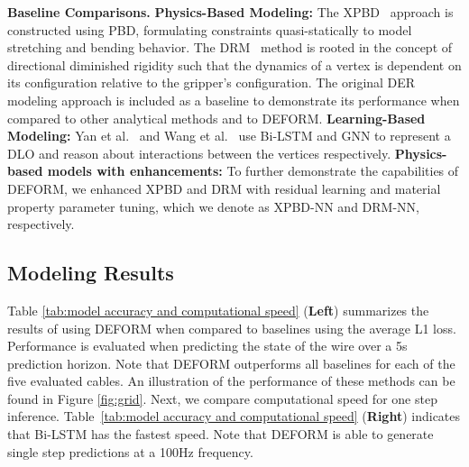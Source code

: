 
\textbf{Baseline Comparisons.}
\textbf{Physics-Based Modeling:} 
The XPBD~\cite{xpbd} approach is constructed using PBD, formulating constraints quasi-statically to model stretching and bending behavior.
The DRM~\cite{directionalrigidity} method is rooted in the concept of directional diminished rigidity such that the dynamics of a vertex is dependent on its configuration relative to the gripper's configuration.
The original DER~\cite{originalDER} modeling approach is included as a baseline to demonstrate its performance when compared to other analytical methods and to DEFORM.
\textbf{Learning-Based Modeling:}
Yan et al.~\cite{bi-LSTM_baseline} and Wang et al.~\cite{GNN_baseline} use Bi-LSTM and GNN to represent a DLO and reason about interactions between the vertices respectively. 
\textbf{Physics-based models with enhancements:}
To further demonstrate the capabilities of DEFORM, we enhanced XPBD and DRM with residual learning and material property parameter tuning, which we denote as XPBD-NN and DRM-NN, respectively. 

\subsection{Modeling Results}

Table \ref{tab:model accuracy and computational speed} (\textbf{Left}) summarizes the results of using DEFORM when compared to baselines using the average L1 loss.
Performance is evaluated when predicting the state of the wire over a 5s prediction horizon.
Note that DEFORM outperforms all baselines for each of the five evaluated cables.
An illustration of the performance of these methods can be found in Figure \ref{fig:grid}.
Next, we compare computational speed for one step inference.
Table~\ref{tab:model accuracy and computational speed} (\textbf{Right}) indicates that Bi-LSTM has the fastest speed. 
Note that DEFORM is able to generate single step predictions at a 100Hz frequency. 


